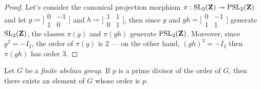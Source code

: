 \begin{proof}
Let's consider the canonical projection morphism
\(\pi: \operatorname{SL}_2(\mathbf{Z}) \twoheadrightarrow \operatorname{PSL}_2(\mathbf{Z})\) and let \(g \coloneq \big[
\begin{smallmatrix}
  0 & -1 \\ 1 & 0
\end{smallmatrix} \big]
\) and \(h \coloneq \big[
\begin{smallmatrix}
  1 & 1 \\ 0 & 1
\end{smallmatrix} \big]\), then since \(g\) and \(g h = \big[
\begin{smallmatrix}
  0 & -1 \\ 1 & 1
\end{smallmatrix} \big]\) generate \(\operatorname{SL}_2(\mathbf{Z})\), the classes \(\pi(g)\) and
\(\pi(gh)\) generate \(\operatorname{PSL}_2(\mathbf{Z})\). Moreover, since \(g^2 = -I_2\), the order
of \(\pi(g)\) is \(2\) --- on the other hand, \((g h)^3 = -I_2\) then
\(\pi(gh)\) has order \(3\).
\end{proof}

\begin{proposition}
\label{prop:finite-abelian-p-div-then-elem-of-p-order}
Let \(G\) be a \emph{finite abelian group}. If \(p\) is a prime divisor of the
order of \(G\), then there exists an element of \(G\) whose order is \(p\).
\end{proposition}

